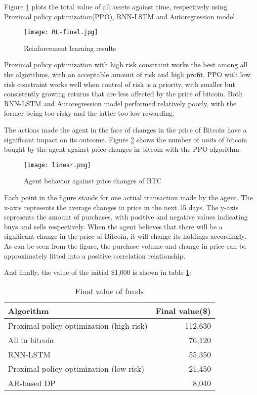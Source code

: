 \documentclass{mcmthesis}
\begin{document}
Figure \ref{RL-Results}  plots the total value of all assets against time,
respectively using Proximal policy optimization(PPO), RNN-LSTM and Autoregression model.

\begin{figure}[h]
  \small
  \centering
  \texttt{[image: RL-final.jpg]}
  \caption{Reinforcement learning results} \label{RL-Results}
\end{figure}

Proximal policy optimization with high risk constraint works the best among all the algorithms, with an acceptable amount of risk and high profit. PPO with low risk constraint works well when control of risk is a priority, with smaller but consistently growing returns that are less affected by the price of bitcoin. Both RNN-LSTM and Autoregression model performed relatively poorly, with the former being too risky and the latter too low rewarding.

The actions made the agent in the face of changes in the price of Bitcoin have a significant impact on its outcome.
Figure \ref{BTC} shows the number of \textit{units} of bitcoin bought by the agent against price changes in bitcoin with the PPO algorithm.

\begin{figure}[h]
  \small
  \centering
  \texttt{[image: linear.png]}
  \caption{Agent behavior against price changes of BTC} \label{BTC}
\end{figure}

Each point in the figure stands for one actual transaction made by the agent.
The x-axis represents the average changes in price in the next 15 days.
The y-axis represents the amount of purchases, with positive and negative values indicating buys and sells respectively.
When the agent believes that there will be a significant change in the price of Bitcoin, it will change its holdings accordingly.
As can be seen from the figure, the purchase volume and change in price can be approximately fitted into a positive correlation relationship.

And finally, the value of the initial \$1,000 is shown in table \ref{final-value}:

\begin{table}[h]
  \centering
  \begin{tabular}{@{}lr@{}}
    \toprule
    Algorithm & Final value(\$) \\
    \midrule
    Proximal policy optimization (high-risk) & 112,630 \\
    {\color{gray} All in bitcoin} & {\color{gray} 76,120} \\
    RNN-LSTM & 55,350 \\
    Proximal policy optimization (low-risk) & 21,450 \\
    AR-based DP & 8,040 \\
    \bottomrule
  \end{tabular}
  \caption{Final value of funds}
  \label{final-value}
\end{table}
\end{document}
